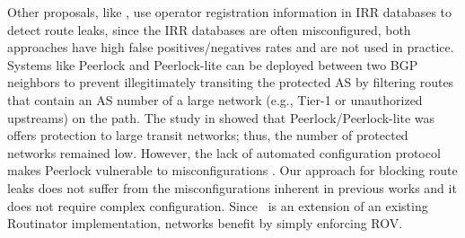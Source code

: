 {%
Other proposals, like \cite{bagnulo2022practicable,MANRS}, use operator registration information in IRR databases to detect route leaks, since the IRR databases are often misconfigured, both approaches have high false positives/negatives rates and are not used in practice.
Systems like Peerlock and Peerlock-lite \cite{mcdaniel2020flexsealing} can be deployed between two BGP neighbors to prevent illegitimately transiting the protected AS by filtering routes that contain an AS number of a large network (e.g., Tier-1 or unauthorized upstreams) on the path. The study in \cite{mcdaniel2020flexsealing} showed that Peerlock/Peerlock-lite was offers protection to large transit networks; thus, the number of protected networks remained low. However, the lack of automated configuration protocol makes Peerlock vulnerable to misconfigurations \cite{mcdaniel2020flexsealing}. Our approach for blocking route leaks does not suffer from the misconfigurations inherent in previous works and it does not require complex configuration. Since \lov\ is an extension of an existing Routinator implementation, networks benefit by simply enforcing ROV. 
}

